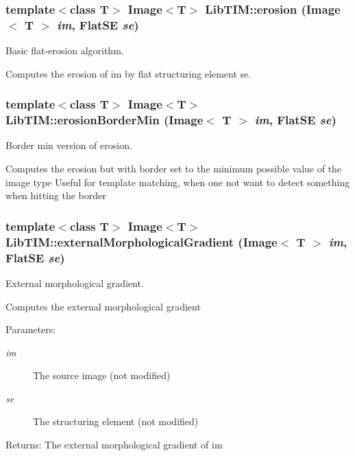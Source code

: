 \subsubsection{\setlength{\rightskip}{0pt plus 5cm}template$<$class T$>$ Image$<$T$>$ Lib\-TIM::erosion (Image$<$ T $>$ {\em im}, Flat\-SE {\em se})}\label{group__basisFunctions_ga3}


Basic flat-erosion algorithm. 

Computes the erosion of im by flat structuring element se.
\subsubsection{\setlength{\rightskip}{0pt plus 5cm}template$<$class T$>$ Image$<$T$>$ Lib\-TIM::erosion\-Border\-Min (Image$<$ T $>$ {\em im}, Flat\-SE {\em se})}\label{group__basisFunctions_ga5}


Border min version of erosion. 

Computes the erosion but with border set to the minimum possible value of the image type Useful for template matching, when one not want to detect something when hitting the border
\subsubsection{\setlength{\rightskip}{0pt plus 5cm}template$<$class T$>$ Image$<$T$>$ Lib\-TIM::external\-Morphological\-Gradient (Image$<$ T $>$ {\em im}, Flat\-SE {\em se})}\label{group__basisFunctions_ga10}


External morphological gradient. 

Computes the external morphological gradient \begin{Desc}
\item[Parameters:]
\begin{description}
\item[{\em im}]The source image (not modified) \item[{\em se}]The structuring element (not modified) \end{description}
\end{Desc}
\begin{Desc}
\item[Returns:]The external morphological gradient of im\end{Desc}
